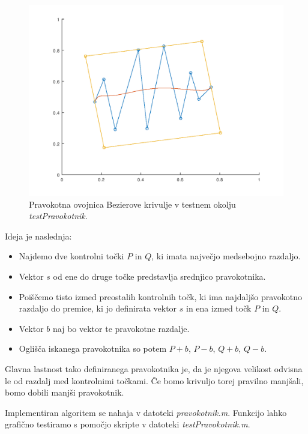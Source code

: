 \documentclass[a4paper, 12pt]{article} %
\begin{document}
\begin{figure}[!h]
	\centering
	\includegraphics[scale=0.5]{pravokotnik}
	\caption{Pravokotna ovojnica Bezierove krivulje v testnem okolju \emph{testPravokotnik}.}
	\label{fig:pravokotnik}
\end{figure}

Ideja je naslednja:
\begin{itemize}
\item Najdemo dve kontrolni točki $P$ in $Q$, ki imata največjo medsebojno razdaljo.
\item Vektor $s$ od ene do druge točke predstavlja srednjico pravokotnika.
\item Poiščemo tisto izmed preostalih kontrolnih točk, ki ima najdaljšo pravokotno razdaljo do premice, ki jo definirata vektor $s$ in ena izmed točk $P$ in $Q$.
\item Vektor $b$ naj bo vektor te pravokotne razdalje.
\item Oglišča iskanega pravokotnika so potem $P + b$, $P - b$, $Q + b$, $Q - b$.
\end{itemize}


Glavna lastnost tako definiranega pravokotnika je, da je njegova velikost odvisna le od razdalj med kontrolnimi točkami. Če bomo krivuljo torej pravilno manjšali, bomo dobili manjši pravokotnik.

Implementiran algoritem se nahaja v datoteki \emph{pravokotnik.m}. Funkcijo lahko grafično testiramo s pomočjo skripte v datoteki \emph{testPravokotnik.m}.
\end{document}
